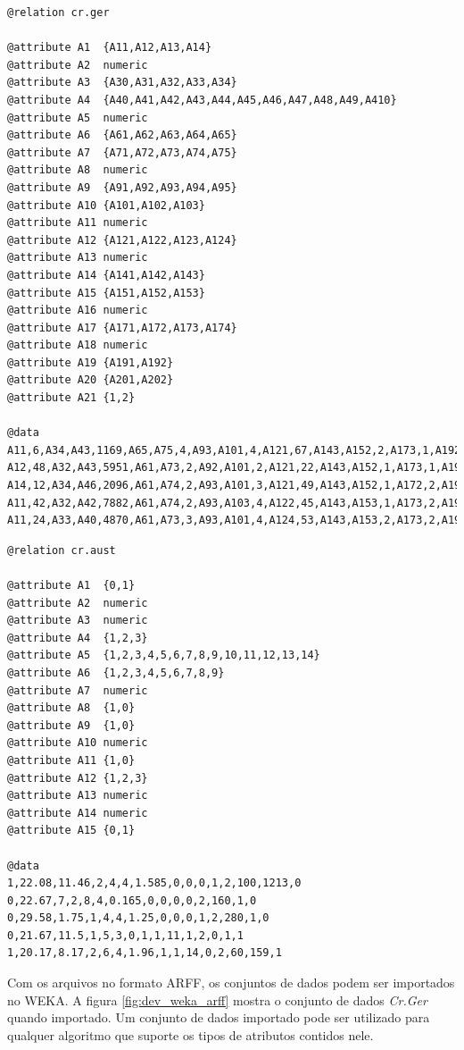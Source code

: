 \vspace{0.5cm}
\begin{lstlisting}[caption=Arquivo ARFF do \emph{Cr.Ger}, label=lst:dev_arff_ger]
@relation cr.ger

@attribute A1  {A11,A12,A13,A14}
@attribute A2  numeric
@attribute A3  {A30,A31,A32,A33,A34}
@attribute A4  {A40,A41,A42,A43,A44,A45,A46,A47,A48,A49,A410}
@attribute A5  numeric
@attribute A6  {A61,A62,A63,A64,A65}
@attribute A7  {A71,A72,A73,A74,A75}
@attribute A8  numeric
@attribute A9  {A91,A92,A93,A94,A95}
@attribute A10 {A101,A102,A103}
@attribute A11 numeric
@attribute A12 {A121,A122,A123,A124}
@attribute A13 numeric
@attribute A14 {A141,A142,A143}
@attribute A15 {A151,A152,A153}
@attribute A16 numeric
@attribute A17 {A171,A172,A173,A174}
@attribute A18 numeric
@attribute A19 {A191,A192}
@attribute A20 {A201,A202}
@attribute A21 {1,2}

@data
A11,6,A34,A43,1169,A65,A75,4,A93,A101,4,A121,67,A143,A152,2,A173,1,A192,A201,1
A12,48,A32,A43,5951,A61,A73,2,A92,A101,2,A121,22,A143,A152,1,A173,1,A191,A201,2
A14,12,A34,A46,2096,A61,A74,2,A93,A101,3,A121,49,A143,A152,1,A172,2,A191,A201,1
A11,42,A32,A42,7882,A61,A74,2,A93,A103,4,A122,45,A143,A153,1,A173,2,A191,A201,1
A11,24,A33,A40,4870,A61,A73,3,A93,A101,4,A124,53,A143,A153,2,A173,2,A191,A201,2
\end{lstlisting}
\vspace{0.5cm}

\vspace{0.5cm}
\begin{lstlisting}[caption=Arquivo ARFF do \emph{Cr.Aust}, label=lst:dev_arff_aust]
@relation cr.aust

@attribute A1  {0,1}
@attribute A2  numeric
@attribute A3  numeric
@attribute A4  {1,2,3}
@attribute A5  {1,2,3,4,5,6,7,8,9,10,11,12,13,14}
@attribute A6  {1,2,3,4,5,6,7,8,9}
@attribute A7  numeric
@attribute A8  {1,0}
@attribute A9  {1,0}
@attribute A10 numeric
@attribute A11 {1,0}
@attribute A12 {1,2,3}
@attribute A13 numeric
@attribute A14 numeric
@attribute A15 {0,1}

@data
1,22.08,11.46,2,4,4,1.585,0,0,0,1,2,100,1213,0
0,22.67,7,2,8,4,0.165,0,0,0,0,2,160,1,0
0,29.58,1.75,1,4,4,1.25,0,0,0,1,2,280,1,0
0,21.67,11.5,1,5,3,0,1,1,11,1,2,0,1,1
1,20.17,8.17,2,6,4,1.96,1,1,14,0,2,60,159,1
\end{lstlisting}
\vspace{0.5cm}

Com os arquivos no formato ARFF, os conjuntos de dados podem ser importados no WEKA. A figura \ref{fig:dev_weka_arff} mostra o conjunto de dados \emph{Cr.Ger} quando importado. Um conjunto de dados importado pode ser utilizado para qualquer algoritmo que suporte os tipos de atributos contidos nele.

